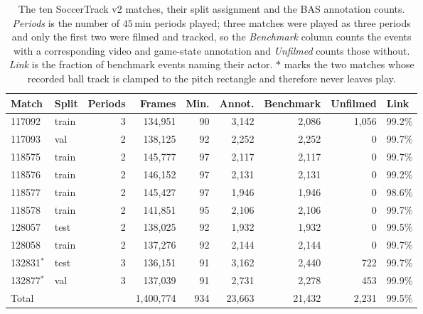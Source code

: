 \begin{table}[t]
  \centering
  \caption{The ten SoccerTrack v2 matches, their split assignment and the BAS annotation counts. \emph{Periods} is the number of $45\,\text{min}$ periods played; three matches were played as three periods and only the first two were filmed and tracked, so the \emph{Benchmark} column counts the events with a corresponding video and game-state annotation and \emph{Unfilmed} counts those without. \emph{Link} is the fraction of benchmark events naming their actor. $\ast$ marks the two matches whose recorded ball track is clamped to the pitch rectangle and therefore never leaves play.}
  \label{tab:bas_dataset}
  \small
  \begin{tabular}{llrrrrrrl}
    \toprule
    Match & Split & Periods & Frames & Min. & Annot. & Benchmark & Unfilmed & Link \\
    \midrule
    117092 & train & 3 & 134,951 & 90 & 3,142 & 2,086 & 1,056 & 99.2\% \\
    117093 & val & 2 & 138,125 & 92 & 2,252 & 2,252 & 0 & 99.7\% \\
    118575 & train & 2 & 145,777 & 97 & 2,117 & 2,117 & 0 & 99.7\% \\
    118576 & train & 2 & 146,152 & 97 & 2,131 & 2,131 & 0 & 99.2\% \\
    118577 & train & 2 & 145,427 & 97 & 1,946 & 1,946 & 0 & 98.6\% \\
    118578 & train & 2 & 141,851 & 95 & 2,106 & 2,106 & 0 & 99.7\% \\
    128057 & test & 2 & 138,025 & 92 & 1,932 & 1,932 & 0 & 99.5\% \\
    128058 & train & 2 & 137,276 & 92 & 2,144 & 2,144 & 0 & 99.7\% \\
    132831$^\ast$ & test & 3 & 136,151 & 91 & 3,162 & 2,440 & 722 & 99.7\% \\
    132877$^\ast$ & val & 3 & 137,039 & 91 & 2,731 & 2,278 & 453 & 99.9\% \\
    \midrule
    Total & & & 1,400,774 & 934 & 23,663 & 21,432 & 2,231 & 99.5\% \\
    \bottomrule
  \end{tabular}
\end{table}
